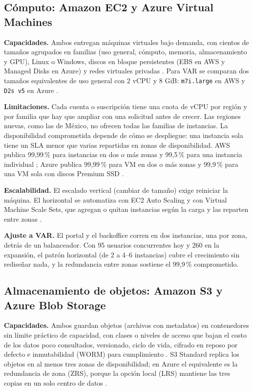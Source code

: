 \documentclass[11pt,letterpaper]{article}
\begin{document}
\subsection{Cómputo: Amazon EC2 y Azure Virtual Machines}
\textbf{Capacidades.} Ambos entregan máquinas virtuales bajo demanda, con cientos de tamaños agrupados en familias (uso general, cómputo, memoria, almacenamiento y GPU), Linux o Windows, discos en bloque persistentes (EBS en AWS y Managed Disks en Azure) y redes virtuales privadas \parencite{aws-ec2,az-vm}. Para VAR se comparan dos tamaños equivalentes de uso general con 2 vCPU y 8 GiB: \texttt{m7i.large} en AWS y \texttt{D2s v5} en Azure \parencite{aws-ec2-types,az-dsv5}.

\textbf{Limitaciones.} Cada cuenta o suscripción tiene una cuota de vCPU por región y por familia que hay que ampliar con una solicitud antes de crecer. Las regiones nuevas, como las de México, no ofrecen todas las familias de instancias. La disponibilidad comprometida depende de cómo se despliegue: una instancia sola tiene un SLA menor que varias repartidas en zonas de disponibilidad. AWS publica 99,99\,\% para instancias en dos o más zonas y 99,5\,\% para una instancia individual \parencite{aws-sla-compute}; Azure publica 99,99\,\% para VM en dos o más zonas y 99,9\,\% para una VM sola con discos Premium SSD \parencite{az-sla}.

\textbf{Escalabilidad.} El escalado vertical (cambiar de tamaño) exige reiniciar la máquina. El horizontal se automatiza con EC2 Auto Scaling y con Virtual Machine Scale Sets, que agregan o quitan instancias según la carga y las reparten entre zonas \parencite{aws-asg,az-vmss}.

\textbf{Ajuste a VAR.} El portal y el backoffice corren en dos instancias, una por zona, detrás de un balanceador. Con 95 usuarios concurrentes hoy y 260 en la expansión, el patrón horizontal (de 2 a 4–6 instancias) cubre el crecimiento sin rediseñar nada, y la redundancia entre zonas sostiene el 99,9\,\% comprometido.

\subsection{Almacenamiento de objetos: Amazon S3 y Azure Blob Storage}
\textbf{Capacidades.} Ambos guardan objetos (archivos con metadatos) en contenedores sin límite práctico de capacidad, con clases o niveles de acceso que bajan el costo de los datos poco consultados, versionado, ciclo de vida, cifrado en reposo por defecto e inmutabilidad (WORM) para cumplimiento \parencite{aws-s3,aws-s3-lock,az-blob}. S3 Standard replica los objetos en al menos tres zonas de disponibilidad; en Azure el equivalente es la redundancia de zona (ZRS), porque la opción local (LRS) mantiene las tres copias en un solo centro de datos \parencite{az-redundancy}.
\end{document}

